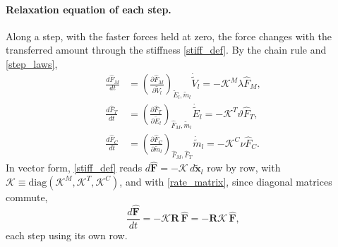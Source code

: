 \paragraph{Relaxation equation of each step.}
Along a step, with the faster forces held at zero, the force changes with the transferred amount through the stiffness \eqref{stiff_def}. By the chain rule and \eqref{step_laws},
\begin{equation}
\begin{aligned}
\frac{d\hat{F}_M}{dt}&=\left(\frac{\partial \hat{F}_M}{\partial\tilde{V}_l}\right)_{\tilde{E}_l,\tilde{m}_l}\dot{\tilde{V}}_l=-\mathcal{K}^M\lambda \hat{F}_M,\\
\frac{d\hat{F}_T}{dt}&=\left(\frac{\partial \hat{F}_T}{\partial\tilde{E}_l}\right)_{\hat{F}_M,\tilde{m}_l}\dot{\tilde{E}}_l=-\mathcal{K}^T\vartheta \hat{F}_T,\\
\frac{d\hat{F}_C}{dt}&=\left(\frac{\partial \hat{F}_C}{\partial\tilde{m}_l}\right)_{\hat{F}_M,\hat{F}_T}\dot{\tilde{m}}_l=-\mathcal{K}^C\nu \hat{F}_C .
\end{aligned}
\end{equation}
In vector form, \eqref{stiff_def} reads $d\hat{\boldsymbol{F}}=-\boldsymbol{\mathcal{K}}\,d\tilde{\boldsymbol{x}}_l$ row by row, with $\boldsymbol{\mathcal{K}}\equiv\mathrm{diag}(\mathcal{K}^M,\mathcal{K}^T,\mathcal{K}^C)$, and with \eqref{rate_matrix}, since diagonal matrices commute,
\begin{equation}\label{force_ode}
\frac{d\hat{\boldsymbol{F}}}{dt}=-\boldsymbol{\mathcal{K}}\boldsymbol{R}\,\hat{\boldsymbol{F}}=-\boldsymbol{R}\boldsymbol{\mathcal{K}}\,\hat{\boldsymbol{F}},
\end{equation}
each step using its own row.

